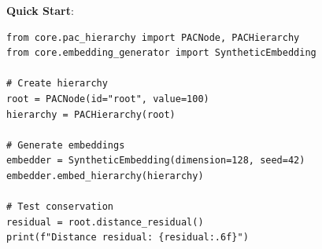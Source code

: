 \documentclass[11pt,a4paper]{article}
\begin{document}
\textbf{Quick Start}:
\begin{verbatim}
from core.pac_hierarchy import PACNode, PACHierarchy
from core.embedding_generator import SyntheticEmbedding

# Create hierarchy
root = PACNode(id="root", value=100)
hierarchy = PACHierarchy(root)

# Generate embeddings
embedder = SyntheticEmbedding(dimension=128, seed=42)
embedder.embed_hierarchy(hierarchy)

# Test conservation
residual = root.distance_residual()
print(f"Distance residual: {residual:.6f}")
\end{verbatim}
\end{document}
